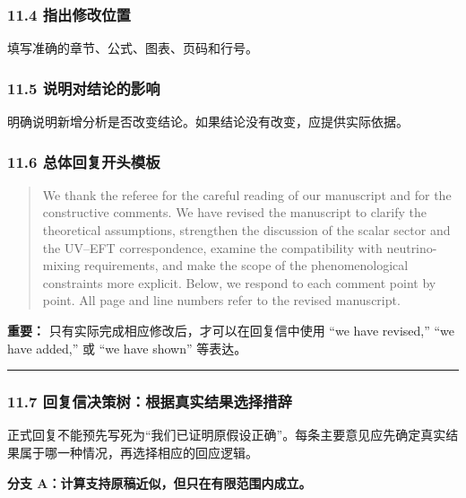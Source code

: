 \documentclass[
  chinese,
  UTF8]{ctexart}
\begin{document}
\subsubsection{11.4
指出修改位置}\label{ux6307ux51faux4feeux6539ux4f4dux7f6e}

填写准确的章节、公式、图表、页码和行号。

\subsubsection{11.5
说明对结论的影响}\label{ux8bf4ux660eux5bf9ux7ed3ux8bbaux7684ux5f71ux54cd}

明确说明新增分析是否改变结论。如果结论没有改变，应提供实际依据。

\subsubsection{11.6
总体回复开头模板}\label{ux603bux4f53ux56deux590dux5f00ux5934ux6a21ux677f}

\begin{quote}
We thank the referee for the careful reading of our manuscript and for
the constructive comments. We have revised the manuscript to clarify the
theoretical assumptions, strengthen the discussion of the scalar sector
and the UV--EFT correspondence, examine the compatibility with
neutrino-mixing requirements, and make the scope of the phenomenological
constraints more explicit. Below, we respond to each comment point by
point. All page and line numbers refer to the revised manuscript.
\end{quote}

\textbf{重要：} 只有实际完成相应修改后，才可以在回复信中使用 ``we have
revised,'' ``we have added,'' 或 ``we have shown'' 等表达。

\begin{center}\rule{0.5\linewidth}{0.5pt}\end{center}

\subsubsection{11.7
回复信决策树：根据真实结果选择措辞}\label{ux56deux590dux4fe1ux51b3ux7b56ux6811ux6839ux636eux771fux5b9eux7ed3ux679cux9009ux62e9ux63aaux8f9e}

正式回复不能预先写死为``我们已证明原假设正确''。每条主要意见应先确定真实结果属于哪一种情况，再选择相应的回应逻辑。

\textbf{分支 A：计算支持原稿近似，但只在有限范围内成立。}
\end{document}
